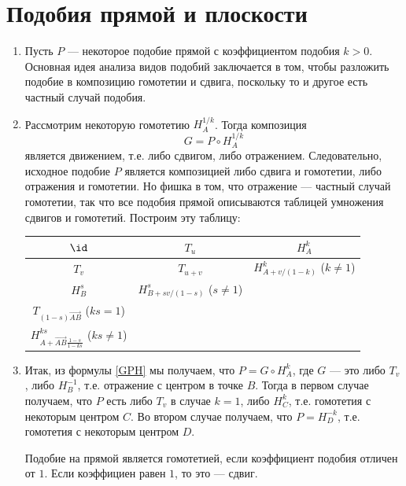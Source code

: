 \section{Подобия прямой и плоскости}




\begin{enumerate}

\item Пусть $P$ --- некоторое подобие прямой с коэффициентом подобия $k>0$. Основная идея анализа видов подобий заключается в том, чтобы разложить подобие в композицию гомотетии и сдвига, поскольку то и другое есть частный случай подобия.
\item Рассмотрим некоторую гомотетию $H_A^{1/k}$. Тогда композиция
\begin{equation}\label{GPH}
G = P\circ H_A^{1/k}
\end{equation}
является движением, т.е. либо сдвигом, либо отражением. Следовательно, исходное подобие $P$ является композицией либо сдвига и гомотетии, либо отражения и гомотетии. Но фишка в том, что отражение --- частный случай гомотетии, так что все подобия прямой описываются таблицей умножения сдвигов и гомотетий. Построим эту таблицу:
\begin{center}
\begin{tabular}{c|c|c|}
$\id$    & $T_u$    &   $H_A^k$  \\ \hline
$T_v$    & $T_{u+v}$ & $\displaystyle H_{A+v/(1-k)}^k$ ($k\ne 1$) \\ \hline
$H_B^s$  &  $\displaystyle H_{B+sv/(1-s)}^s$ ($s\ne 1$)  & \specialcell{ $H_{A}^{ks}$ ($A=B$) \\[2pt]
$\displaystyle T_{(1-s)\vec{AB}}$ ($ks=1$) \\[4pt]  $\displaystyle H_{A+\vec{AB}\frac{1-s}{1-ks}}^{ks}$ ($ks\ne 1$) } \\ \hline
\end{tabular}
\end{center}
\item Итак, из формулы \eqref{GPH} мы получаем, что $P=G\circ H_A^k$, где $G$ --- это либо $T_v$, либо $H_B^{-1}$, т.е. отражение с центром в точке $B$. Тогда в первом случае получаем, что $P$ есть либо $T_v$ в случае $k=1$, либо $H_C^k$, т.е. гомотетия с некоторым центром $C$. Во втором случае получаем, что $P=H_D^{-k}$, т.е. гомотетия с некоторым центром $D$.
\begin{thrm}
Подобие на прямой является гомотетией, если коэффициент подобия отличен от $1$. Если коэффициен равен $1$, то это --- сдвиг.
\end{thrm}




\end{enumerate}
